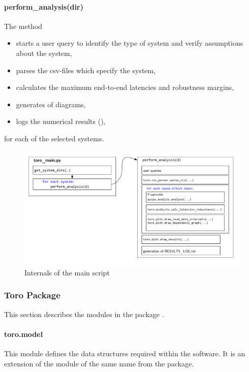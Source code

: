 \paragraph{perform\_analysis(dir)}
The method  
\begin{itemize}[itemsep=0pt]
	\item starts a user query to identify the type of system and verify assumptions about the system,
	\item parses the csv-files which specify the system,
	\item calculates the maximum end-to-end latencies and robustness margins,
	\item generates of diagrams,
	\item logs the numerical results (), 
\end{itemize}
for each of the selected systems.
\begin{figure}[H]
		\centering
		\includegraphics[width=\textwidth]{fig/toro_architecture.pdf}
		\caption{Internals of the main script }
		\label{fig:toro_internals}
\end{figure}

 
\subsubsection{Toro Package}
\label{sec:toro_lib}
    
This section describes the modules in the package .

\paragraph{toro.model}
This module defines the data structures required within the software. 
It is an extension of the module of the same name from the  package.

